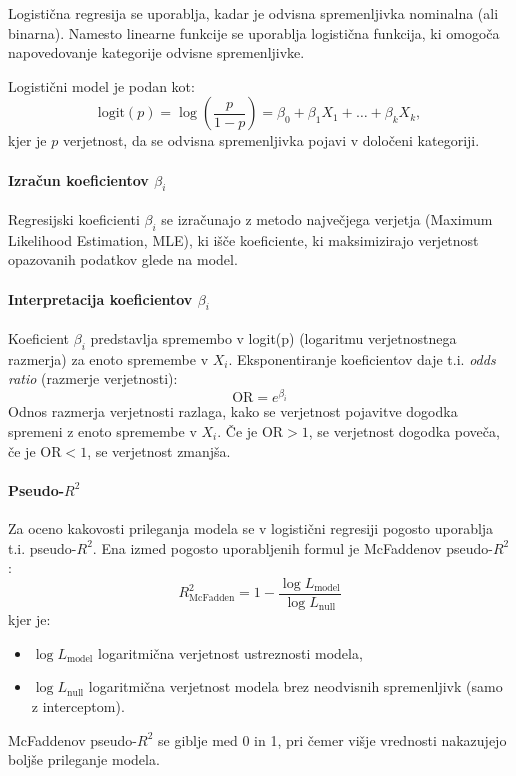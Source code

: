 Logistična regresija se uporablja, kadar je odvisna spremenljivka nominalna (ali binarna). Namesto linearne funkcije se uporablja logistična funkcija, ki omogoča napovedovanje kategorije odvisne spremenljivke.

Logistični model je podan kot:
\[\text{logit}(p) = \log\left(\frac{p}{1-p}\right) = \beta_0 + \beta_1 X_1 + \ldots + \beta_k X_k,\]
kjer je $p$ verjetnost, da se odvisna spremenljivka pojavi v določeni kategoriji.

\paragraph{Izračun koeficientov $\beta_i$}
Regresijski koeficienti $\beta_i$ se izračunajo z metodo največjega verjetja (Maximum Likelihood Estimation, MLE), ki išče koeficiente, ki maksimizirajo verjetnost opazovanih podatkov glede na model.

\paragraph{Interpretacija koeficientov $\beta_i$}
Koeficient $\beta_i$ predstavlja spremembo v logit(p) (logaritmu verjetnostnega razmerja) za enoto spremembe v $X_i$. Eksponentiranje koeficientov daje t.i. \emph{odds ratio} (razmerje verjetnosti):
\[\text{OR} = e^{\beta_i}\]
Odnos razmerja verjetnosti razlaga, kako se verjetnost pojavitve dogodka spremeni z enoto spremembe v $X_i$. Če je $\text{OR} > 1$, se verjetnost dogodka poveča, če je $\text{OR} < 1$, se verjetnost zmanjša.

\paragraph{Pseudo-$R^2$}
Za oceno kakovosti prileganja modela se v logistični regresiji pogosto uporablja t.i. pseudo-$R^2$. Ena izmed pogosto uporabljenih formul je McFaddenov pseudo-$R^2$:
\[R^2_{\text{McFadden}} = 1 - \frac{\log L_{\text{model}}}{\log L_{\text{null}}}\]
kjer je:
\begin{itemize}
    \item $\log L_{\text{model}}$ logaritmična verjetnost ustreznosti modela,
    \item $\log L_{\text{null}}$ logaritmična verjetnost modela brez neodvisnih spremenljivk (samo z interceptom).
\end{itemize}

McFaddenov pseudo-$R^2$ se giblje med 0 in 1, pri čemer višje vrednosti nakazujejo boljše prileganje modela.

